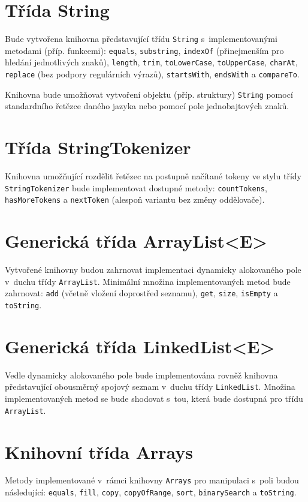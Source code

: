 \documentclass{bakalarka}
\begin{document}
\section{Třída String}
Bude vytvořena knihovna představující třídu \texttt{String} s~implementovanými metodami (příp. funkcemi): \texttt{equals}, \texttt{substring}, \texttt{indexOf} (přinejmenším pro hledání jednotlivých znaků), \texttt{length}, \texttt{trim}, \texttt{toLowerCase}, \texttt{toUpperCase}, \texttt{charAt}, \texttt{replace} (bez podpory regulárních výrazů), \texttt{startsWith}, \texttt{endsWith} a \texttt{compareTo}.\par
Knihovna bude umožňovat vytvoření objektu (příp. struktury) \texttt{String} pomocí standardního řetězce daného jazyka nebo pomocí pole jednobajtových znaků.

\section{Třída StringTokenizer}
Knihovna umožňující rozdělit řetězec na postupně načítané tokeny ve stylu třídy \texttt{StringTokenizer} bude implementovat dostupné metody: \texttt{countTokens}, \texttt{hasMoreTokens} a \texttt{nextToken} (alespoň variantu bez změny oddělovače).

\section{Generická třída ArrayList<E>}
Vytvořené knihovny budou zahrnovat implementaci dynamicky alokovaného pole v~duchu třídy \texttt{ArrayList}. Minimální množina implementovaných metod bude zahrnovat: \texttt{add} (včetně vložení doprostřed seznamu), \texttt{get}, \texttt{size}, \texttt{isEmpty} a \texttt{toString}.

\section{Generická třída LinkedList<E>}
Vedle dynamicky alokovaného pole bude implementována rovněž knihovna představující obousměrný spojový seznam v~duchu třídy \texttt{LinkedList}. Množina implementovaných metod se bude shodovat s~tou, která bude dostupná pro třídu \texttt{ArrayList}.

\section{Knihovní třída Arrays}
Metody implementované v~rámci knihovny \texttt{Arrays} pro manipulaci s~poli budou následující: \texttt{equals}, \texttt{fill}, \texttt{copy}, \texttt{copyOfRange}, \texttt{sort}, \texttt{binarySearch} a \texttt{toString}.
\end{document}
